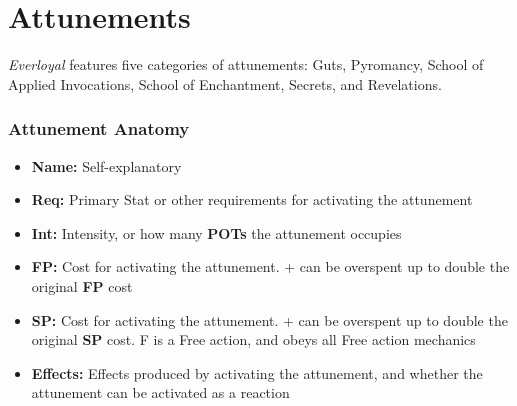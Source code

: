\section{Attunements}
\emph{Everloyal} features five categories of attunements: Guts, Pyromancy, School of Applied Invocations, School of Enchantment, Secrets, and Revelations.

\subsubsection*{Attunement Anatomy}
\begin{itemize}
\item \textbf{Name:} Self-explanatory
\item \textbf{Req:} Primary Stat or other requirements for activating the attunement
\item \textbf{Int:} Intensity, or how many \textbf{POTs} the attunement occupies 
\item \textbf{FP:} Cost for activating the attunement. + can be overspent up to double the original \textbf{FP} cost
\item \textbf{SP:} Cost for activating the attunement. + can be overspent up to double the original \textbf{SP} cost. F is a Free action, and obeys all Free action mechanics
\item \textbf{Effects:} Effects produced by activating the attunement, and whether the attunement can be activated as a reaction
\end{itemize}



\pagebreak



\pagebreak



\pagebreak



\pagebreak



\pagebreak

